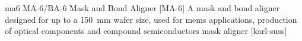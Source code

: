\newglsXequipment%
{ma6}%
{MA{\--}6/BA{\--}6 Mask and Bond Aligner}%
[MA{\--}6]%
{A mask and bond aligner designed for up to a \SI{150}{\milli\meter} wafer size, used for \gls{mems} applications, production of optical components and compound semiconductors}%
{mask aligner}%
[karl-suss]%